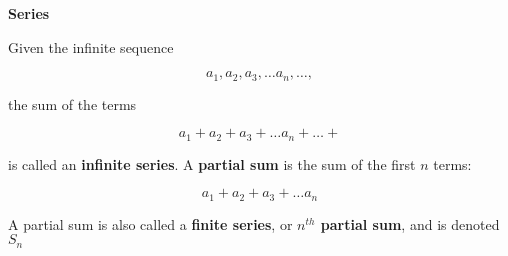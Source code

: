 {\bf Series}
\vskip 6pt

Given the infinite sequence

$$a_1,a_2,a_3, \ldots a_n, \ldots ,$$

the sum of the terms

$$a_1+a_2+a_3+ \ldots a_n+ \ldots +$$

is called an {\bf infinite series}. A {\bf partial sum} is the sum of the first $n$ terms:

$$a_1+a_2+a_3+ \ldots a_n$$

A partial sum is also called a {\bf finite series}, or {\bf $n^{th}$ partial sum}, and is denoted $S_n$

\vfill\eject
